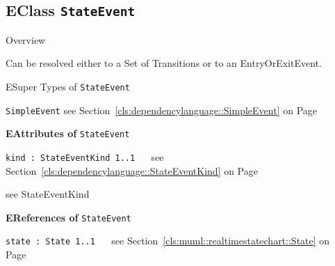 \subsection{EClass \bfseries \texttt{StateEvent}\normalfont}
\label{cls:dependencylanguage::StateEvent} 
	
	\begin{longdescription}
		\item[Overview] 		
				

	

		Can be resolved either to a Set of Transitions or to an EntryOrExitEvent.		
		\item[ESuper Types of \texttt{StateEvent}] ~
			\begin{longdescription}
				\item[\texttt{SimpleEvent}] see Section~\ref{cls:dependencylanguage::SimpleEvent} on Page~\pageref{cls:dependencylanguage::SimpleEvent}						\end{longdescription}
		
	
			\item[\textbf{EAttributes of} \texttt{StateEvent}] ~
			\begin{longdescription}
	\item[\texttt{kind : StateEventKind \symbol{"5B}1..1\symbol{"5D}
}] ~
	see Section~\ref{cls:dependencylanguage::StateEventKind} on Page~\pageref{cls:dependencylanguage::StateEventKind}
	
	\nopagebreak
		
				

	

		see StateEventKind		
			\end{longdescription}
			\item[\textbf{EReferences of} \texttt{StateEvent}] ~
			\begin{longdescription}
	\item[\texttt{state : State \symbol{"5B}1..1\symbol{"5D}
}] ~
	see Section~\ref{cls:muml::realtimestatechart::State} on Page~\pageref{cls:muml::realtimestatechart::State}
	
	\nopagebreak
		
				

	

	
			\end{longdescription}
	
	\end{longdescription}
	

